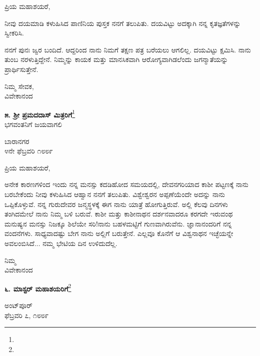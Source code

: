 \noindent
ಪ್ರಿಯ ಮಹಾಶಯರೆ,

ನೀವು ದಯಮಾಡಿ ಕಳುಹಿಸಿದ ಪಾಣಿನಿಯ ಪುಸ್ತಕ ನನಗೆ ತಲುಪಿತು. ದಯವಿಟ್ಟು ಅದಕ್ಕಾಗಿ ನನ್ನ ಕೃತಜ್ಞತೆಗಳನ್ನು ಸ್ವೀಕರಿಸಿ.

ನನಗೆ ಪುನಃ ಜ್ವರ ಬಂದಿದೆ. ಆದ್ದರಿಂದ ನಾನು ನಿಮಗೆ ತಕ್ಷಣ ಪತ್ರ ಬರೆಯಲು ಆಗಲಿಲ್ಲ. ದಯವಿಟ್ಟು ಕ್ಷಮಿಸಿ. ನಾನು ತುಂಬ ನರಳುತ್ತಿದ್ದೇನೆ. ನಿಮ್ಮನ್ನು ಕಾಯಕ ಮತ್ತು ಮಾನಸಿಕವಾಗಿ ಆರೋಗ್ಯವಾಗಿಡಲೆಂದು ಜಗನ್ಮಾತೆಯನ್ನು ಪ್ರಾರ್ಥಿಸುತ್ತೇನೆ.

{\flushright
ನಿಮ್ಮ ಸೇವಕ,\\ವಿವೇಕಾನಂದ\par}

\begin{center}
\textbf{೫. ಶ‍್ರೀ ಪ್ರಮದದಾಸ್‌ ಮಿತ್ರರಿಗೆ}\footnote{}\\ ಭಗವಂತನಿಗೆ ಜಯವಾಗಲಿ
\end{center}

\vspace{-0.4cm}

\begin{flushright}
ಬಾರಾನಗರ\\೪ನೇ ಫೆಬ್ರವರಿ ೧೮೮೯
\end{flushright}

\noindent
ಪ್ರಿಯ ಮಹಾಶಯರೆ,

ಅನೇಕ ಕಾರಣಗಳಿಂದ ಇಂದು ನನ್ನ ಮನಸ್ಸು ಕದಡಿಹೋದ ಸಮಯದಲ್ಲಿ, ದೇವನಗರಿಯಾದ ಕಾಶೀ ಪಟ್ಟಣಕ್ಕೆ ನಾನು ಬರಬೇಕೆಂದು ನೀವು ಕಳುಹಿಸಿದ ಆಹ್ವಾನ ನನಗೆ ತಲುಪಿತು. ವಿಶ್ವೇಶ್ವರನ ಅಪ್ಪಣೆಯೆಂದೇ ಅದನ್ನು ನಾನು ಒಪ್ಪಿಕೊಳ್ಳುವೆ. ನನ್ನ ಗುರುದೇವರ ಜನ್ಮಸ್ಥಳಕ್ಕೆ ಈಗ ನಾನು ಯಾತ್ರೆ ಹೋಗುತ್ತಿರುವೆ. ಅಲ್ಲಿ ಕೆಲವು ದಿನಗಳು ತಂಗಿದಮೇಲೆ ನಾನು ನಿಮ್ಮ ಬಳಿ ಬರುವೆ. ಕಾಶೀ ಮತ್ತು ಕಾಶೀನಾಥನ ದರ್ಶನವಾದರೂ ಕರಗದೇ ಇರುವಂಥ ಮನುಷ್ಯನ ಮನಸ್ಸು ನಿಜಕ್ಕೂ ಶಿಲೆಯೇ ಸರಿ!ನಾನು ಬಹಳಮಟ್ಟಿಗೆ ಗುಣವಾಗಿರುವೆನು. ಜ್ಞಾನಾನಂದರಿಗೆ ನನ್ನ ವಂದನೆಗಳು. ಸಾಧ್ಯವಾದಷ್ಟು ಬೇಗ ನಾನು ಅಲ್ಲಿಗೆ ಬರುತ್ತೇನೆ. ಎಲ್ಲವೂ ಕೊನೆಗೆ ಆ ವಿಶ್ವನಾಥನ ಇಚ್ಛೆಯನ್ನೇ ಅವಲಂಬಿಸಿದೆ... ನಮ್ಮ ಭೇಟಿಯ ದಿನ ಉಳಿದುದೆಲ್ಲ.

\vspace{-0.3cm}

{\flushright
ನಿಮ್ಮ\\ವಿವೇಕಾನಂದ\par}

\vspace{-0.3cm}

\begin{center}
\textbf{೬. ಮಾಸ್ಟರ್ ಮಹಾಶಯರಿಗೆ}\footnote{}
\end{center}

\vspace{-0.5cm}

\begin{flushright}
ಅಂಟ್‌ಪೂರ್‌\\ಫೆಬ್ರವರಿ ೭, ೧೮೮೯
\end{flushright}

